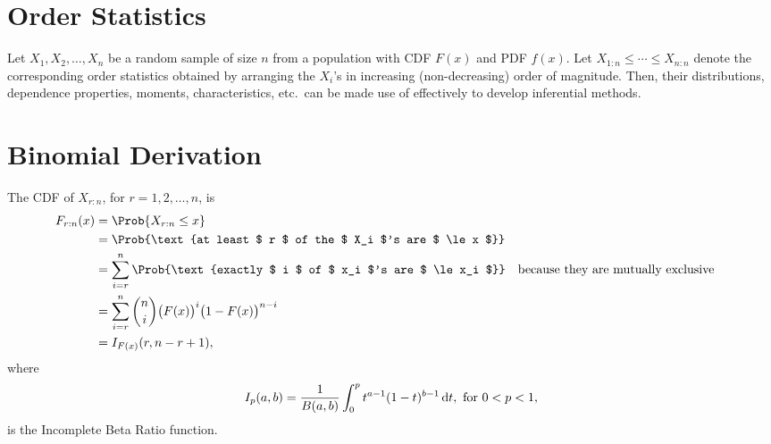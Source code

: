 \section*{Order Statistics}
Let $ X_1,X_2,\ldots,X_n $ be a random sample of size $ n $ from a population with CDF $ F(x) $
and PDF $ f(x) $. Let $ X_{1:n}\le \cdots \le X_{n:n} $ denote the corresponding order statistics obtained by arranging the $ X_i $'s
in increasing (non-decreasing) order of magnitude. Then, their distributions, dependence properties,
moments, characteristics, etc.\ can be made use of effectively to develop inferential methods.
\section*{Binomial Derivation}
The CDF of $ X_{r:n} $, for $ r=1,2,\ldots,n $, is
\begin{align*}
    F_{r:n}(x)
     & =\Prob{X_{r:n}\le x}                                                                                                    \\
     & =\Prob{\text{at least $ r $ of the $ X_i $'s are $ \le x $}}                                                            \\
     & =\sum_{i=r}^{n}\Prob{\text{exactly $ i $ of $ x_i $'s are $ \le x_i $}} &  & \text{because they are mutually exclusive} \\
     & =\sum_{i=r}^{n}\binom{n}{i}\bigl(F(x)\bigr)^i\bigl(1-F(x)\bigr)^{n-i}                                                   \\
     & =I_{F(x)}(r,n-r+1),
\end{align*}
where
\[ I_p(a,b)=\frac{1}{B(a,b)}\int_{0}^{p}t^{a-1}(1-t)^{b-1}\odif{t},\text{ for } 0<p<1, \]
is the Incomplete Beta Ratio function.

